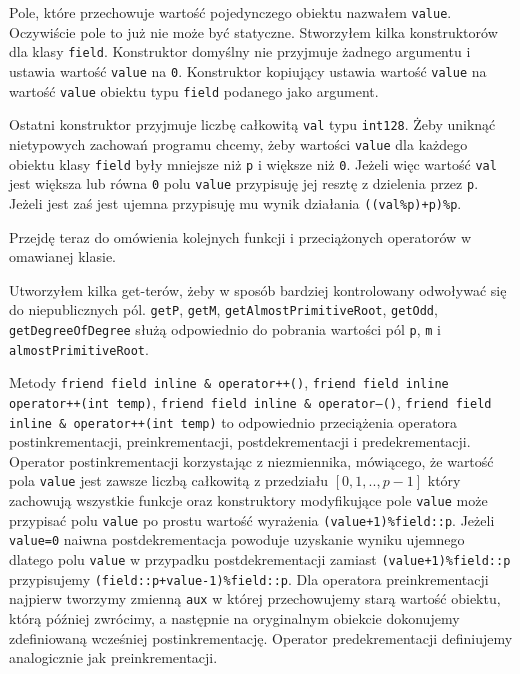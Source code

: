 \documentclass{article}
\begin{document}
Pole, które przechowuje wartość pojedynczego obiektu nazwałem \texttt{value}. Oczywiście
pole to już nie może być statyczne.
Stworzyłem kilka konstruktorów dla klasy \texttt{field}. Konstruktor domyślny
nie przyjmuje żadnego argumentu i ustawia wartość \texttt{value} na \texttt{0}.
Konstruktor kopiujący ustawia wartość \texttt{value} na wartość \texttt{value} obiektu 
typu \texttt{field} podanego jako argument. 

Ostatni konstruktor przyjmuje liczbę całkowitą \texttt{val} 
typu \texttt{\textunderscore \textunderscore int128}. Żeby uniknąć nietypowych zachowań programu chcemy, żeby wartości \texttt{value} dla 
każdego obiektu klasy \texttt{field} były mniejsze niż \texttt{p} i większe niż \texttt{0}. Jeżeli więc wartość \texttt{val}
jest większa lub równa \texttt{0} polu \texttt{value} przypisuję
jej resztę z dzielenia przez \texttt{p}. Jeżeli jest zaś jest ujemna przypisuję mu wynik działania \texttt{((val\%p)+p)\%p}.


Przejdę teraz do omówienia kolejnych funkcji i przeciążonych operatorów
w omawianej klasie.

Utworzyłem kilka get-terów, żeby w sposób bardziej kontrolowany odwoływać się do niepublicznych pól. 
\texttt{getP}, \texttt{getM}, \texttt{getAlmostPrimitiveRoot}, \texttt{getOdd}, \texttt{getDegreeOfDegree}
służą odpowiednio do pobrania wartości pól \texttt{p}, \texttt{m} i \texttt{almostPrimitiveRoot}.

Metody \texttt{friend field inline \& operator++()}, 
\texttt{friend field inline operator++(int temp)},
\texttt{friend field inline \& operator--()},
\texttt{friend field inline \& operator++(int temp)} to odpowiednio przeciążenia
operatora postinkrementacji, preinkrementacji, postdekrementacji i predekrementacji.
Operator postinkrementacji korzystając z niezmiennika, mówiącego,
że wartość pola \texttt{value} jest zawsze liczbą całkowitą z
przedziału $[0,1,..,p-1]$ który
zachowują wszystkie funkcje oraz konstruktory modyfikujące pole \texttt{value} 
może przypisać polu \texttt{value} po prostu wartość wyrażenia
\texttt{(value+1)\%field::p}. Jeżeli \texttt{value=0} naiwna postdekrementacja
powoduje uzyskanie wyniku ujemnego dlatego polu \texttt{value} w przypadku postdekrementacji
zamiast \texttt{(value+1)\%field::p} przypisujemy 
\texttt{(field::p+value-1)\%field::p}. Dla operatora 
preinkrementacji najpierw tworzymy zmienną \texttt{aux} w której przechowujemy
starą wartość obiektu, którą później zwrócimy, a następnie na oryginalnym 
obiekcie dokonujemy zdefiniowaną wcześniej postinkrementację.
Operator predekrementacji definiujemy analogicznie jak preinkrementacji.
\end{document}
